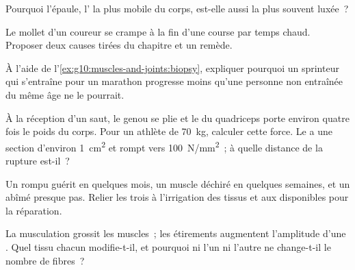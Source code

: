 \begin{exercise}[$\star\star$]\label{exo:g10:muscles-and-joints:9}
Pourquoi l'épaule, l' la plus mobile du corps, est-elle
aussi la plus souvent luxée~?
\end{exercise}

\begin{exercise}[$\star\star$]\label{exo:g10:muscles-and-joints:10}
Le mollet d'un coureur se crampe à la fin d'une course par temps
chaud. Proposer deux causes tirées du chapitre et un remède.
\end{exercise}

\begin{exercise}[$\star\star$]\label{exo:g10:muscles-and-joints:11}
À l'aide de l'\cref{ex:g10:muscles-and-joints:biopsy}, expliquer
pourquoi un sprinteur qui s'entraîne pour un marathon progresse moins
qu'une personne non entraînée du même âge ne le pourrait.
\end{exercise}

\begin{exercise}[$\star\star\star$]\label{exo:g10:muscles-and-joints:12}
À la réception d'un saut, le genou se plie et le  du quadriceps
porte environ quatre fois le poids du corps. Pour un athlète de
\qty{70}{kg}, calculer cette force. Le  a une section d'environ
\qty{1}{cm^2} et rompt vers \qty{100}{N/mm^2}~; à quelle distance de la
rupture est-il~?
\end{exercise}

\begin{exercise}[$\star\star\star$]\label{exo:g10:muscles-and-joints:13}
Un  rompu guérit en quelques mois, un muscle déchiré en
quelques semaines, et un  abîmé presque pas. Relier les trois
à l'irrigation des tissus et aux  disponibles pour la
réparation.
\end{exercise}

\begin{exercise}[$\star\star\star$]\label{exo:g10:muscles-and-joints:14}
La musculation grossit les muscles~; les étirements augmentent
l'amplitude d'une . Quel tissu chacun modifie-t-il, et
pourquoi ni l'un ni l'autre ne change-t-il le nombre de fibres~?
\end{exercise}

